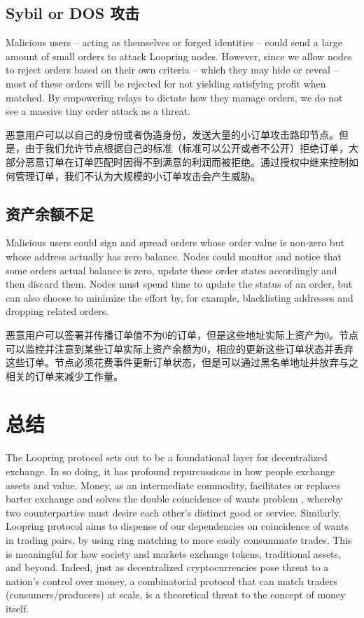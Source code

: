 \documentclass[UTF8,nofonts]{ctexart}
\begin{document}
\begin{multicols}{2}
\subsection{Sybil or DOS 攻击}
Malicious users -- acting as themselves or forged identities -- could send a large amount of small orders to attack Loopring nodes. However, since we allow nodes to reject orders based on their own criteria -- which they may hide or reveal -- most of these orders will be rejected for not yielding satisfying profit when matched.  By empowering relays to dictate how they manage orders, we do not see a massive tiny order attack as a threat.

恶意用户可以以自己的身份或者伪造身份，发送大量的小订单攻击路印节点。但是，由于我们允许节点根据自己的标准（标准可以公开或者不公开）拒绝订单，大部分恶意订单在订单匹配时因得不到满意的利润而被拒绝。通过授权中继来控制如何管理订单，我们不认为大规模的小订单攻击会产生威胁。


\subsection{资产余额不足}
Malicious users could sign and spread orders whose order value is non-zero but whose address actually has zero balance. Nodes could monitor and notice that some orders actual balance is zero, update these order states accordingly and then discard them.
Nodes must spend time to update the status of an order, but can also choose to minimize the effort by, for example, blacklisting addresses and dropping related orders.

恶意用户可以签署并传播订单值不为0的订单，但是这些地址实际上资产为0。节点可以监控并注意到某些订单实际上资产余额为0，相应的更新这些订单状态并丢弃这些订单。节点必须花费事件更新订单状态，但是可以通过黑名单地址并放弃与之相关的订单来减少工作量。


\section{总结}

The Loopring protocol sets out to be a foundational layer for decentralized exchange. In so doing, it has profound repurcussions in how people exchange assets and value. Money, as an intermediate commodity, facilitates or replaces barter exchange and solves the double coincidence of wants problem \cite{unenumerated2006}, whereby two counterparties must desire each other's distinct good or service. Similarly, Loopring protocol aims to dispense of our dependencies on coincidence of wants in trading pairs, by using ring matching to more easily consummate trades. This is meaningful for how society and markets exchange tokens, traditional assets, and beyond. Indeed, just as decentralized cryptocurrencies pose threat to a nation's control over money, a combinatorial protocol that can match traders (consumers/producers) at scale, is a theoretical threat to the concept of money itself.


\end{multicols}
\end{document}

